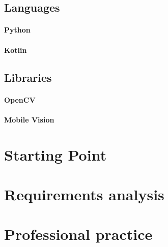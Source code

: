 \subsection{Languages}
\paragraph{Python}
\paragraph{Kotlin}

\subsection{Libraries}
\label{section:libraries}
\paragraph{OpenCV}
\paragraph{Mobile Vision}


\section{Starting Point}

\section{Requirements analysis}


\section{Professional practice}
